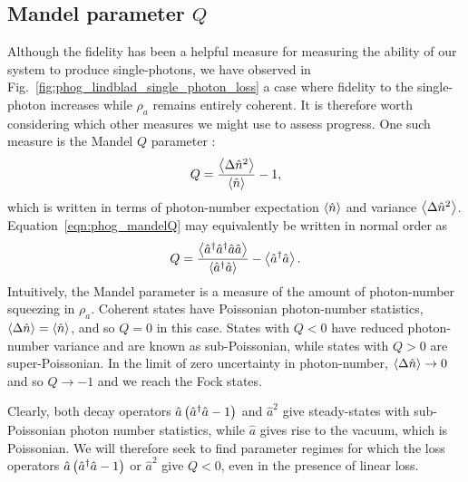 \subsection{Mandel parameter $Q$}
Although the fidelity has been a helpful measure for measuring the ability of our system to produce single-photons, we have observed in Fig.~\ref{fig:phog_lindblad_single_photon_loss} a case where fidelity to the single-photon increases while $\rho_a$ remains entirely coherent. It is therefore worth considering which other measures we might use to assess progress. One such measure is the Mandel $Q$ parameter \cite{Mandel1979, Carmichael1999, Davidovich1996}:
\begin{equation}\label{eqn:phog_mandelQ}
Q = \frac{\ev{\Delta\hat{n}^2}}{\ev{\hat{n}}} - 1,
\end{equation}
which is written in terms of photon-number expectation $\ev{\hat{n}}$ and variance $\ev{\Delta\hat{n}^2}$. Equation~\ref{eqn:phog_mandelQ} may equivalently be written in normal order as 
\begin{equation}
Q = \frac{\ev{\hat{a}^\dagger \hat{a}^\dagger \hat{a}\hat{a}}}{\ev{\hat{a}^\dagger \hat{a}}} - \ev{\hat{a}^\dagger \hat{a}}.
\end{equation}
Intuitively, the Mandel parameter is a measure of the amount of photon-number squeezing in $\rho_a$. Coherent states have Poissonian photon-number statistics, $\ev{\Delta\hat{n}} = \ev{\hat{n}}$, and so $Q = 0$ in this case. States with $Q < 0$ have reduced photon-number variance and are known as sub-Poissonian, while states with $Q > 0$ are super-Poissonian. In the limit of zero uncertainty in photon-number, $\ev{\Delta\hat{n}} \rightarrow 0$ and so $Q \rightarrow -1$ and we reach the Fock states.

Clearly, both decay operators $\hat{a}\left(\hat{a}^\dagger \hat{a} - 1\right)$ and $\hat{a}^2$ give steady-states with sub-Poissonian photon number statistics, while $\hat{a}$ gives rise to the vacuum, which is Poissonian. We will therefore seek to find parameter regimes for which the loss operators $\hat{a}\left(\hat{a}^\dagger \hat{a} - 1\right)$ or $\hat{a}^2$ give $Q<0$, even in the presence of linear loss.


